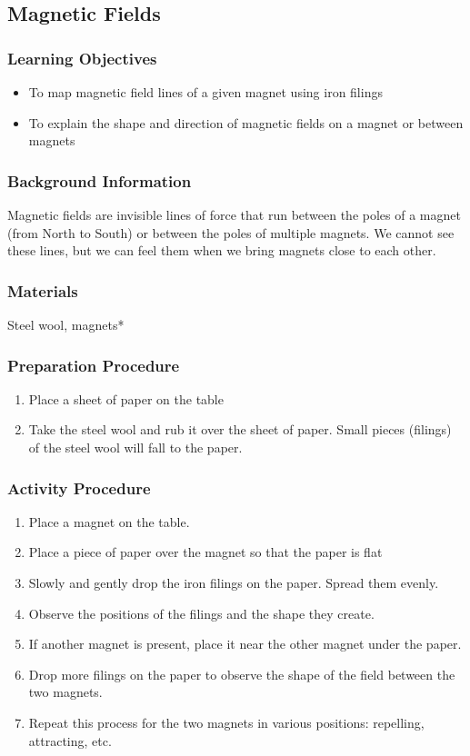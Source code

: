\subsection{Magnetic Fields}

\subsubsection*{Learning Objectives}
\begin{itemize}
\item{To map magnetic field lines of a given magnet using iron filings}
\item{To explain the shape and direction of magnetic fields on a magnet or between magnets}
\end{itemize}

\subsubsection*{Background Information}
Magnetic fields are invisible lines of force that run between the poles of a magnet (from North to South) or between the poles of multiple magnets.  We cannot see these lines, but we can feel them when we bring magnets close to each other.

\subsubsection*{Materials}
Steel wool, magnets*

\subsubsection*{Preparation Procedure}
\begin{enumerate}
\item{Place a sheet of paper on the table}
\item{Take the steel wool and rub it over the sheet of paper.  Small pieces (filings) of the steel wool will fall to the paper.}
\end{enumerate}

\subsubsection*{Activity Procedure}
\begin{enumerate}
\item{Place a magnet on the table.}
\item{Place a piece of paper over the magnet so that the paper is flat}
\item{Slowly and gently drop the iron filings on the paper.  Spread them evenly.}
\item{Observe the positions of the filings and the shape they create.}
\item{If another magnet is present, place it near the other magnet under the paper.}
\item{Drop more filings on the paper to observe the shape of the field between the two magnets.}
\item{Repeat this process for the two magnets in various positions: repelling, attracting, etc.}
\end{enumerate}

